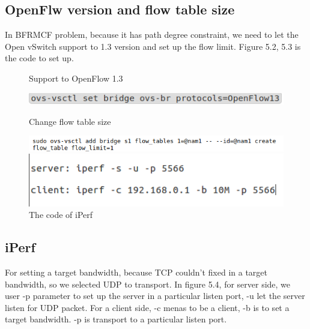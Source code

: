 \documentclass[a4paper,12pt]{report}
\begin{document}
\begin{CJK*}{UTF8}{bkai}
\begin{large}
\subsection{ OpenFlw version and flow table size}	
\qquad In BFRMCF problem, because it has path degree constraint, we need to let the Open vSwitch support to 1.3 version and set up the flow limit. Figure 5.2, 5.3 is the code to set up. 
			\begin{figure}[b]
	          \caption{Support to OpenFlow 1.3}
	          \centering
	            \includegraphics[width=1.0\textwidth]{openflow1_3.png}
	          \caption{Change flow table size}
	            \includegraphics[width=1.0\textwidth]{flow_table.png}
	          \caption{The code of iPerf}
	          \centering
	            \includegraphics[width=1.0\textwidth]{iperf.png}
	      	\end{figure}
\subsection{iPerf}
	\qquad For setting a target bandwidth, because TCP couldn't fixed in a target bandwidth, so we selected UDP to transport. In figure 5.4, for server side, we user -p parameter to set up the server in a particular listen port, -u let the server listen for UDP packet.
	\newline\null\qquad For a client side, -c menas to be a client, -b is to set a target bandwidth. -p is transport to a particular listen port.

\end{large}
\end{CJK*}
\end{document}

